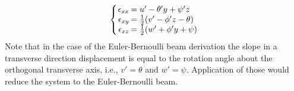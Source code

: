 %
\begin{equation}\label{eq:StrainEvaluatedSimple}
\left\{\arraycolsep=1pt\begin{array}{rl}
\epsilon_{xx}&=u'-\theta'y+\psi'z\\
\epsilon_{xy}&=\frac{1}{2}(v'-\phi'z-\theta)\\
\epsilon_{xz}&=\frac{1}{2}(w'+\phi'y+\psi)
\end{array}\right.
\end{equation}
Note that in the case of the Euler-Bernoulli beam derivation the slope in a transverse direction displacement is equal to the rotation angle about the orthogonal transverse axis, i.e., $v'=\theta$ and $w'=\psi$. Application of those would reduce the system to the Euler-Bernoulli beam.\par

